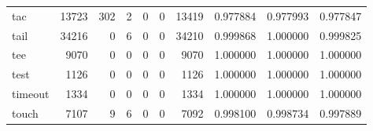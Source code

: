 \begin{tabular}{lrrrrrrrrr}
tac       &                               13723 &                                             302 &                                              2 &                                             0 &                                              0 &                                        13419 &                                           0.977884 &                               0.977993 &                             0.977847 \\
tail      &                               34216 &                                               0 &                                              6 &                                             0 &                                              0 &                                        34210 &                                           0.999868 &                               1.000000 &                             0.999825 \\
tee       &                                9070 &                                               0 &                                              0 &                                             0 &                                              0 &                                         9070 &                                           1.000000 &                               1.000000 &                             1.000000 \\
test      &                                1126 &                                               0 &                                              0 &                                             0 &                                              0 &                                         1126 &                                           1.000000 &                               1.000000 &                             1.000000 \\
timeout   &                                1334 &                                               0 &                                              0 &                                             0 &                                              0 &                                         1334 &                                           1.000000 &                               1.000000 &                             1.000000 \\
touch     &                                7107 &                                               9 &                                              6 &                                             0 &                                              0 &                                         7092 &                                           0.998100 &                               0.998734 &                             0.997889 \\

\end{tabular}
